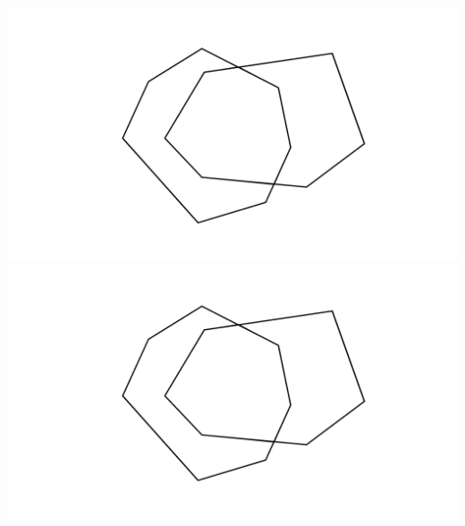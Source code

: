 \documentclass[a4paper,12pt]{article}
\begin{document}
\begin{center}
\vspace{35pt}
\includegraphics[width=0.375\linewidth]{../images/worksheet2b_no_color.pdf}\hspace{50pt}
\includegraphics[width=0.375\linewidth]{../images/worksheet2b_no_color.pdf}
\end{center}
\end{document}
